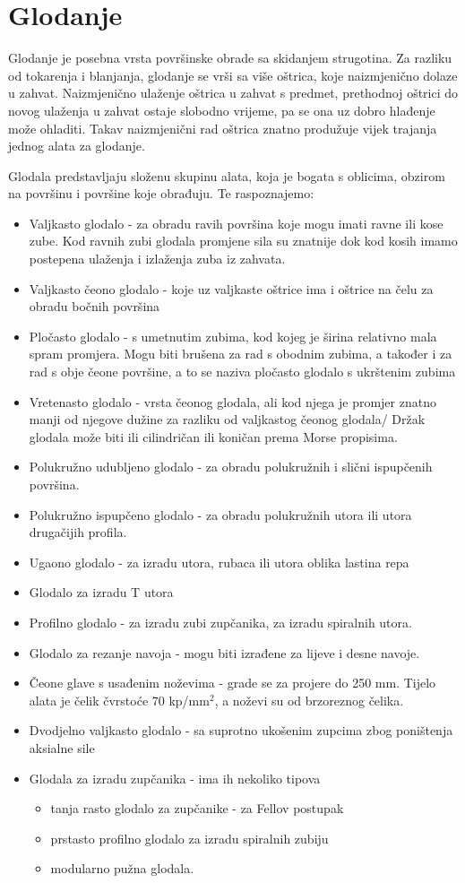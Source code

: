 \documentclass[a4paper,12pt]{article}
\numberwithin{figure}{section}
\begin{document}
\section{Glodanje}
Glodanje je posebna vrsta površinske obrade sa skidanjem strugotina. Za razliku od tokarenja i blanjanja, glodanje se vrši sa više oštrica, koje naizmjenično dolaze u zahvat. Naizmjenično ulaženje oštrica u zahvat s predmet, prethodnoj oštrici do novog ulaženja u zahvat ostaje slobodno vrijeme, pa se ona uz dobro hlađenje može ohladiti. Takav naizmjenični rad oštrica znatno produžuje vijek trajanja jednog alata za glodanje.\par
Glodala predstavljaju složenu skupinu alata, koja je bogata s oblicima, obzirom na površinu i površine koje obrađuju. Te raspoznajemo:
\begin{itemize}
\item Valjkasto glodalo - za obradu ravih površina koje mogu imati ravne ili kose zube. Kod ravnih zubi glodala promjene sila su znatnije dok kod kosih imamo postepena ulaženja i izlaženja zuba iz zahvata.
\item Valjkasto čeono glodalo - koje uz valjkaste oštrice ima i oštrice na čelu za obradu bočnih površina
\item Pločasto glodalo - s umetnutim zubima, kod kojeg je širina relativno mala spram promjera. Mogu biti brušena za rad s obodnim zubima, a također i za rad s obje čeone površine, a to se naziva pločasto glodalo s ukrštenim zubima
\item Vretenasto glodalo - vrsta čeonog glodala, ali kod njega je promjer znatno manji od njegove dužine za razliku od valjkastog čeonog glodala/ Držak glodala može biti ili cilindričan ili koničan prema Morse propisima.
\item Polukružno udubljeno glodalo - za obradu polukružnih i slični ispupčenih površina.
\item Polukružno ispupčeno glodalo - za obradu polukružnih utora ili utora drugačijih profila.
\item Ugaono glodalo - za izradu utora, rubaca ili utora oblika lastina repa
\item Glodalo za izradu T utora
\item Profilno glodalo - za izradu zubi zupčanika, za izradu spiralnih utora.
\item Glodalo za rezanje navoja - mogu biti izrađene za lijeve i desne navoje.
\item Čeone glave s usađenim noževima - grade se za projere do 250 mm. Tijelo alata je čelik čvrstoće 70 kp/mm$^{2}$, a noževi su od brzoreznog čelika.
\item Dvodjelno valjkasto glodalo - sa suprotno ukošenim zupcima zbog poništenja aksialne sile
\item  Glodala za izradu zupčanika - ima ih nekoliko tipova 
\begin{itemize}
\item tanja rasto glodalo za zupčanike - za Fellov postupak
\item prstasto profilno glodalo za izradu spiralnih zubiju
\item modularno pužna glodala.
\end{itemize}
\end{itemize}
\end{document}
